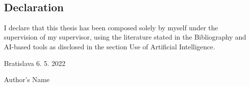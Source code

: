 
\
\vfill

\subsection*{Declaration}

I declare that this thesis has been composed solely by myself under the supervision of my supervisor, using the literature stated in the Bibliography and AI-based tools as disclosed in the section Use of Artificial Intelligence.


\vspace{10pt}

\noindent Bratislava 6. 5. 2022 \hfil
\newline

\begin{flushright}
	Author's Name $\qquad$
\end{flushright}
